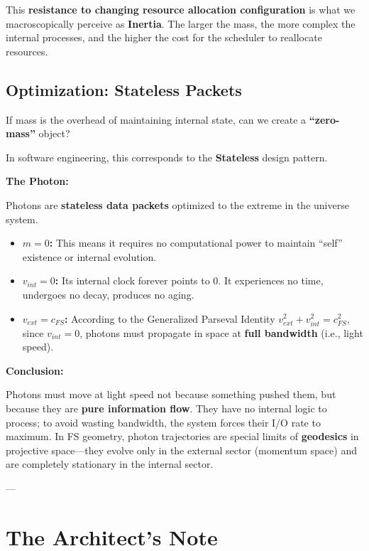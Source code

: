 This \textbf{resistance to changing resource allocation configuration} is what we macroscopically perceive as \textbf{Inertia}. The larger the mass, the more complex the internal processes, and the higher the cost for the scheduler to reallocate resources.

\subsection{Optimization: Stateless Packets}

If mass is the overhead of maintaining internal state, can we create a \textbf{``zero-mass''} object?

In software engineering, this corresponds to the \textbf{Stateless} design pattern.

\textbf{The Photon:}

Photons are \textbf{stateless data packets} optimized to the extreme in the universe system.

\begin{itemize}
\item \textbf{$m = 0$:} This means it requires no computational power to maintain ``self'' existence or internal evolution.

\item \textbf{$v_{int} = 0$:} Its internal clock forever points to 0. It experiences no time, undergoes no decay, produces no aging.

\item \textbf{$v_{ext} = c_{FS}$:} According to the Generalized Parseval Identity \textbf{$v_{ext}^2 + v_{int}^2 = c_{FS}^2$}, since \textbf{$v_{int}=0$}, photons must propagate in space at \textbf{full bandwidth} (i.e., light speed).
\end{itemize}

\textbf{Conclusion:}

Photons must move at light speed not because something pushed them, but because they are \textbf{pure information flow}. They have no internal logic to process; to avoid wasting bandwidth, the system forces their I/O rate to maximum. In FS geometry, photon trajectories are special limits of \textbf{geodesics} in projective space---they evolve only in the external sector (momentum space) and are completely stationary in the internal sector.

---

\section{The Architect's Note}

